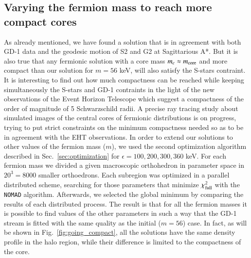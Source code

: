 \documentclass[twocolumn]{aa}
\begin{document}
\subsection{Varying the fermion mass to reach more compact cores}
As already mentioned, we have found a solution that is in agreement with both GD-1 data and
the geodesic motion of S2 and G2 at Sagittarious A*. But it is also true that any fermionic solution
with a core mass $m_c\approx m_{\rm{core}}$ and more compact than our solution for $m=56$ keV, will
also satisfy the S-stars contraint. It is interesting to find out how much compactness can be reached
while keeping simultaneously the S-stars and GD-1 contraints in the light of the new observations
of the Event Horizon Telescope which suggest a compactness of the order of magnitude of 5 Schwarzschild radii.
A precise ray tracing study about simulated images of the central
cores of fermionic distributions is on progress, trying to put strict constraints on the minimum
compactness needed so as to be in agreement with the EHT observations.
In order to extend our solutions to other values of the fermion mass ($m$), we used the second optimization algorithm described in Sec.~\ref{sec:optimization} for $\epsilon=100, 200, 300, 360$ keV. For each fermion mass we divided a given macroscopic orthohedron in parameter space in $20^3=8000$ smaller orthoedrons. Each subregion was optimized in a parallel distributed scheme, searching for those parameters that minimize $\chi^2_{\rm{full}}$ with the \texttt{NOMAD} algorithm. Afterwards, we selected the global minimum by comparing the results of each distributed process.
The result is that for all the fermion masses it is possible to find values of the other parameters in such a way that the GD-1 stream is fitted with the same quality as the initial ($m=56$) case. In fact, as will be shown in Fig.~\ref{fig:going_compact}, all the solutions have the same density profile in the halo region, while their difference is limited to the compactness of the core.
\end{document}
